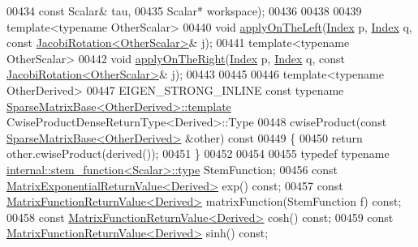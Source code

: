 \begin{DoxyCode}
00434                                     \textcolor{keyword}{const} Scalar& tau,
00435                                     Scalar* workspace);
00436 
00438 
00439     \textcolor{keyword}{template}<\textcolor{keyword}{typename} OtherScalar>
00440     \textcolor{keywordtype}{void} \hyperlink{group___core___module_a3a08ad41e81d8ad4a37b5d5c7490e765}{applyOnTheLeft}(\hyperlink{namespace_eigen_a62e77e0933482dafde8fe197d9a2cfde}{Index} p, \hyperlink{namespace_eigen_a62e77e0933482dafde8fe197d9a2cfde}{Index} q, \textcolor{keyword}{const} 
      \hyperlink{group___jacobi___module_class_eigen_1_1_jacobi_rotation}{JacobiRotation<OtherScalar>}& j);
00441     \textcolor{keyword}{template}<\textcolor{keyword}{typename} OtherScalar>
00442     \textcolor{keywordtype}{void} \hyperlink{group___core___module_a45d91752925d2757fc8058a293b15462}{applyOnTheRight}(\hyperlink{namespace_eigen_a62e77e0933482dafde8fe197d9a2cfde}{Index} p, \hyperlink{namespace_eigen_a62e77e0933482dafde8fe197d9a2cfde}{Index} q, \textcolor{keyword}{const} 
      \hyperlink{group___jacobi___module_class_eigen_1_1_jacobi_rotation}{JacobiRotation<OtherScalar>}& j);
00443 
00445 
00446     \textcolor{keyword}{template}<\textcolor{keyword}{typename} OtherDerived>
00447     EIGEN\_STRONG\_INLINE \textcolor{keyword}{const} \textcolor{keyword}{typename} \hyperlink{group___sparse_core___module_class_eigen_1_1_sparse_matrix_base}{SparseMatrixBase<OtherDerived>::template}
       CwiseProductDenseReturnType<Derived>::Type
00448     cwiseProduct(\textcolor{keyword}{const} \hyperlink{group___sparse_core___module_class_eigen_1_1_sparse_matrix_base}{SparseMatrixBase<OtherDerived>} &other)\textcolor{keyword}{ const}
00449 \textcolor{keyword}{    }\{
00450       \textcolor{keywordflow}{return} other.cwiseProduct(derived());
00451     \}
00452 
00454 
00455     \textcolor{keyword}{typedef} \textcolor{keyword}{typename} \hyperlink{struct_eigen_1_1internal_1_1stem__function}{internal::stem\_function<Scalar>::type} 
      StemFunction;
00456     \textcolor{keyword}{const} \hyperlink{struct_eigen_1_1_matrix_exponential_return_value}{MatrixExponentialReturnValue<Derived>} exp() \textcolor{keyword}{const};
00457     \textcolor{keyword}{const} \hyperlink{class_eigen_1_1_matrix_function_return_value}{MatrixFunctionReturnValue<Derived>} matrixFunction(StemFunction 
      f) \textcolor{keyword}{const};
00458     \textcolor{keyword}{const} \hyperlink{class_eigen_1_1_matrix_function_return_value}{MatrixFunctionReturnValue<Derived>} cosh() \textcolor{keyword}{const};
00459     \textcolor{keyword}{const} \hyperlink{class_eigen_1_1_matrix_function_return_value}{MatrixFunctionReturnValue<Derived>} sinh() \textcolor{keyword}{const};

\end{DoxyCode}
